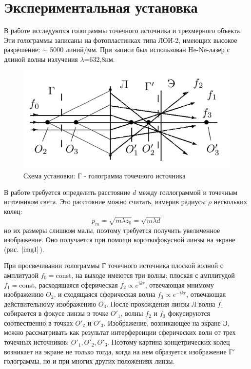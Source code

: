 \documentclass[a4paper,12pt]{article}
\begin{document}
\section{Экспериментальная установка}

В работе исследуются голограммы точечного источника и трехмерного объекта. Эти голограммы записаны на фотопластинках типа ЛОИ-2, имеющих высокое разрешение: $\sim$ 5000 линий/мм. При записи был использован He-Ne-лазер с длиной волны излучения $\lambda$=632,8нм.

\begin{figure}[h]
\centering
\includegraphics[width=0.8\linewidth]{img1.png}
\caption{Схема установки: Г - голограмма точечного источника}
\label{img1}
\end{figure}

В работе требуется определить расстояние $d$ между голлограммой и точечным источником света. Это расстояние можно считать, измерив радиусы $\rho$ нескольких колец:
\begin{equation}
    p_m=\sqrt{m\lambda z_0}=\sqrt{m\lambda d}
\end{equation}
но их размеры слишком малы, поэтому требуется получить увеличенное изображение. Оно получается при помощи короткофокусной линзы на экране (рис. $\ref{img1}$).

При просвечивании голограммы Г точечного источника плоской волной с амплитудой $f_0=$const, на выходе имеются три волны: плоская с амплитудой $f_1=$const, расходящаяся сферическая $f_2 \propto e^{ikr}$, отвечающая мнимому изображению $O_2$, и сходящаяся сферическая волна $f_3 \propto e^{-ikr}$, отвечающая действительному изображению $O_3$. После прохождения линзы Л волна $f_1$ собирается в фокусе линзы в точке $O'_1$, волны $f_2$ и $f_3$ фокусируются соотвественно в точках $O'_2$ и $O'_3$. Изображение, возникающее на экране Э, можно рассматривать как результат интерференции сферических волн от трех точечных источников: $O'_1, O'_2, O'_3$. Поэтому картина концетрических колец возникает на экране не только тогда, когда на нем образуется изображение $\text{Г}'$ голограммы, но и при многих других положениях линзы. 
\end{document}
